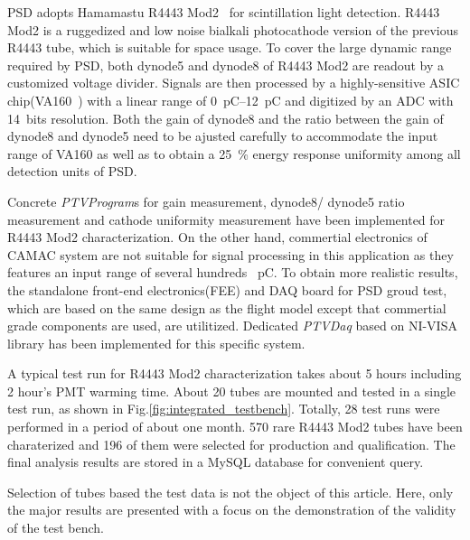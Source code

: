 \documentclass[5p, times]{elsarticle}
\begin{document}
PSD adopts Hamamastu R4443 Mod2~\cite{r4443_mod2} for scintillation light detection.
R4443 Mod2 is a ruggedized and low noise bialkali photocathode version of the previous R4443 tube, which is suitable for space usage. 
To cover the large dynamic range required by PSD, both dynode5 and dynode8 of R4443 Mod2 are readout by a customized voltage divider.
Signals are then processed by a highly-sensitive ASIC chip(VA160~\cite{va160}) with a linear range of \SIrange{0}{12}{\pico\coulomb} and digitized by an ADC with 14~bits resolution.
Both the gain of dynode8 and the ratio between the gain of dynode8 and dynode5 need to be ajusted carefully to accommodate the input range of VA160 as well as to obtain a \SI{25}{\percent} energy response uniformity among all detection units of PSD.

Concrete \textit{PTVProgram}s for gain measurement, dynode8/ dynode5 ratio measurement and cathode uniformity measurement have been implemented for R4443 Mod2 characterization.
On the other hand, commertial electronics of CAMAC system are not suitable for signal processing in this application as they features an input range of several hundreds \SI{}{\pico\coulomb}.
To obtain more realistic results, the standalone front-end electronics(FEE) and DAQ board for PSD groud test, which are based on the same design as the flight model except that commertial grade components are used, are utilitized.
Dedicated \textit{PTVDaq} based on NI-VISA library has been implemented for this specific system.

A typical test run for R4443 Mod2 characterization takes about 5 hours including 2 hour's PMT warming time.
About 20 tubes are mounted and tested in a single test run, as shown in Fig.\ref{fig:integrated_testbench}.
Totally, 28 test runs were performed in a period of about one month.
570 rare R4443 Mod2 tubes have been charaterized and 196 of them were selected for production and qualification.
The final analysis results are stored in a MySQL database for convenient query.

Selection of tubes based the test data is not the object of this article.
Here, only the major results are presented with a focus on the demonstration of the validity of the test bench. 
\end{document}
